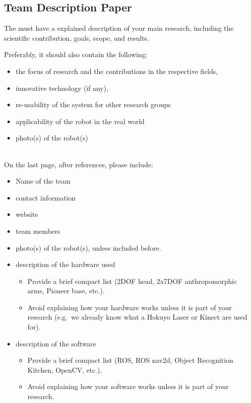 \subsection{Team Description Paper}
\label{rule:website_tdp}

The  must have a explained description of your main research, including the scientific contribution, goals, scope, and results.

Preferably, it should also contain the following:
\begin{itemize}
	\item the focus of research and the contributions in the respective fields, 
	\item innovative technology (if any), 
	\item re-usability of the system for other research groups
	\item applicability of the robot in the real world
	\item photo(s) of the robot(s)
\end{itemize}

~\\\noindent On the last page, after references, please include:
\begin{itemize}
	\item Name of the team
	\item contact information
	\item website
	\item team members
	\item photo(s) of the robot(s), unless included before.
	\item description of the hardware used 
	\begin{itemize}
		\item Provide a brief compact list (2DOF head, 2x7DOF anthropomorphic arms, Pioneer base, etc.).
		\item Avoid explaining how your hardware works unless it is part of your research (e.g.~we already know what a Hokuyo Laser or Kinect are used for).
	\end{itemize}
	\item description of the software
	\begin{itemize}
		\item Provide a brief compact list (ROS, ROS nav2d, Object Recognition Kitchen, OpenCV, etc.).
		\item Avoid explaining how your software works unless it is part of your research.
	\end{itemize}
\end{itemize}

